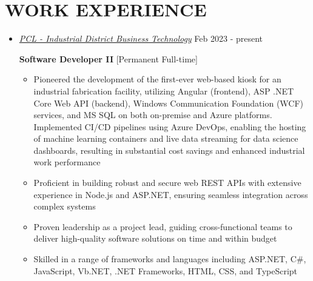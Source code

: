 \documentclass[10pt,letterpaper,sans]{moderncv} %
\begin{document}
	\section{WORK EXPERIENCE}
	\begin{itemize}
		\item \href{http://pcl.com/}{ \emph{\large PCL - Industrial District Business Technology}} \hfill Feb 2023 - present
		\vspace{0.25cm}
		
		\textbf{Software Developer II} [Permanent Full-time]
		
		\begin{itemize}
			\item Pioneered the development of the first-ever web-based kiosk for an industrial fabrication facility, utilizing Angular (frontend), ASP .NET Core Web API (backend), Windows Communication Foundation (WCF) services, and MS SQL on both on-premise and Azure platforms. Implemented CI/CD pipelines using Azure DevOps, enabling the hosting of machine learning containers and live data streaming for data science dashboards, resulting in substantial cost savings and enhanced industrial work performance
			
			\item Proficient in building robust and secure web REST APIs with extensive experience in Node.js and ASP.NET, ensuring seamless integration across complex systems
			
			\item Proven leadership as a project lead, guiding cross-functional teams to deliver high-quality software solutions on time and within budget
			
			\item Skilled in a range of frameworks and languages including ASP.NET, C\#, JavaScript, Vb.NET, .NET Frameworks, HTML, CSS, and TypeScript

		\end{itemize}
	\end{itemize}
	
\end{document}
